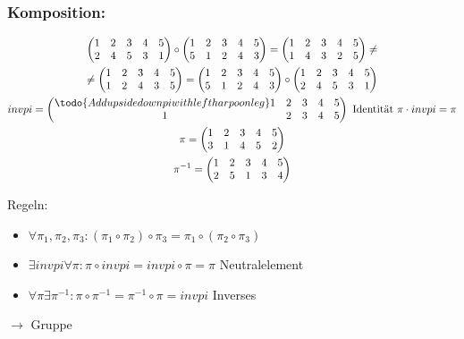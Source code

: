 \subsubsection{Komposition:}
\begin{gather*}
	\begin{split}
		\begin{pmatrix}
			1	&2	&3	&4	&5	\\
			2	&4	&5	&3	&1	
		\end{pmatrix} \circ \begin{pmatrix}
			1	&2	&3	&4	&5	\\
			5	&1	&2	&4	&3
		\end{pmatrix} = \begin{pmatrix}
			1	&2	&3	&4	&5	\\
			1	&4	&3	&2	&5
		\end{pmatrix} \neq \\
		\neq \begin{pmatrix}
			1	&2	&3	&4	&5	\\
			1	&2	&4	&3	&5	
		\end{pmatrix} = \begin{pmatrix}
			1	&2	&3	&4	&5	\\
			5	&1	&2	&4	&3
		\end{pmatrix} \circ \begin{pmatrix}
			1	&2	&3	&4	&5	\\
			2	&4	&5	&3	&1	
		\end{pmatrix}
	\end{split} \\
	invpi = \begin{pmatrix}	 \todo{Add upsidedown pi with left harpoon leg}
		1	&2	&3	&4	&5	\\
		1	&2	&3	&4	&5
	\end{pmatrix} \text{ Identität } \pi \cdot invpi = \pi \\
	\pi = \begin{pmatrix}
			1	&2	&3	&4	&5	\\
			3	&1	&4	&5	&2	
	\end{pmatrix} \\
	\pi^{-1} = \begin{pmatrix}
			1	&2	&3	&4	&5	\\
			2	&5	&1	&3	&4	
	\end{pmatrix}
\end{gather*}

Regeln:
\begin{itemize}
	\item $\forall \pi_1 , \pi_2 , \pi_3 : ( \pi_1 \circ \pi_2 ) \circ \pi_3 = \pi_1 \circ ( \pi_2 \circ \pi_3 )$
	\item $\exists invpi \forall \pi : \pi \circ invpi = invpi \circ \pi = \pi$ Neutralelement
	\item $\forall \pi \exists \pi^{-1} : \pi \circ \pi^{-1} = \pi^{-1} \circ \pi = invpi$ Inverses
\end{itemize}
$\rightarrow$ Gruppe


